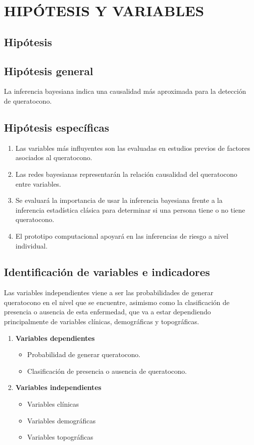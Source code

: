 \newpage
\chapter{HIPÓTESIS Y VARIABLES}
\section{Hipótesis}

\section{Hipótesis general}
La inferencia bayesiana indica una causalidad más aproximada para la detección de queratocono.

\section{Hipótesis específicas}

\begin{enumerate}
    \item Las variables más influyentes son las evaluadas en estudios previos de factores asociados al queratocono.
    \item Las redes bayesianas representarán la relación causalidad del queratocono entre variables.
    \item Se evaluará la importancia de usar la inferencia bayesiana frente a la inferencia estadística clásica para determinar si una persona tiene o no tiene queratocono.
    \item El prototipo computacional apoyará en las inferencias de riesgo a nivel individual.
\end{enumerate}

\section{Identificación de variables e indicadores}

Las variables independientes viene a ser las probabilidades de generar queratocono en el nivel que se encuentre, asimismo como la clasificación de presencia o ausencia de esta enfermedad, que va a estar dependiendo principalmente de variables clínicas, demográficas y topográficas.

\begin{enumerate}
    \item \textbf{Variables dependientes}
    \begin{itemize}
        \item Probabilidad de generar queratocono.
        \item Clasificación de presencia o ausencia de queratocono. 
    \end{itemize}
    \item \textbf{Variables independientes} 
    \begin{itemize}
        \item Variables clínicas
        \item Variables demográficas
        \item Variables topográficas 
    \end{itemize}
\end{enumerate}

